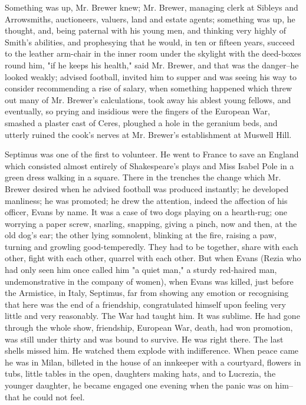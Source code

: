 \documentclass[lang=cn,10pt]{elegantbook}
\begin{document}
Something was up, Mr. Brewer knew; Mr. Brewer, managing clerk at
Sibleys and Arrowsmiths, auctioneers, valuers, land and estate
agents; something was up, he thought, and, being paternal with his
young men, and thinking very highly of Smith's abilities, and
prophesying that he would, in ten or fifteen years, succeed to the
leather arm-chair in the inner room under the skylight with the
deed-boxes round him, "if he keeps his health," said Mr. Brewer,
and that was the danger--he looked weakly; advised football,
invited him to supper and was seeing his way to consider
recommending a rise of salary, when something happened which threw
out many of Mr. Brewer's calculations, took away his ablest young
fellows, and eventually, so prying and insidious were the fingers
of the European War, smashed a plaster cast of Ceres, ploughed a
hole in the geranium beds, and utterly ruined the cook's nerves at
Mr. Brewer's establishment at Muswell Hill.

Septimus was one of the first to volunteer.  He went to France to
save an England which consisted almost entirely of Shakespeare's
plays and Miss Isabel Pole in a green dress walking in a square.
There in the trenches the change which Mr. Brewer desired when he
advised football was produced instantly; he developed manliness; he
was promoted; he drew the attention, indeed the affection of his
officer, Evans by name.  It was a case of two dogs playing on a
hearth-rug; one worrying a paper screw, snarling, snapping, giving
a pinch, now and then, at the old dog's ear; the other lying
somnolent, blinking at the fire, raising a paw, turning and
growling good-temperedly.  They had to be together, share with each
other, fight with each other, quarrel with each other.  But when
Evans (Rezia who had only seen him once called him "a quiet man," a
sturdy red-haired man, undemonstrative in the company of women),
when Evans was killed, just before the Armistice, in Italy,
Septimus, far from showing any emotion or recognising that here was
the end of a friendship, congratulated himself upon feeling very
little and very reasonably.  The War had taught him.  It was
sublime.  He had gone through the whole show, friendship, European
War, death, had won promotion, was still under thirty and was bound
to survive.  He was right there.  The last shells missed him.  He
watched them explode with indifference.  When peace came he was in
Milan, billeted in the house of an innkeeper with a courtyard,
flowers in tubs, little tables in the open, daughters making hats,
and to Lucrezia, the younger daughter, he became engaged one
evening when the panic was on him--that he could not feel.
\end{document}
